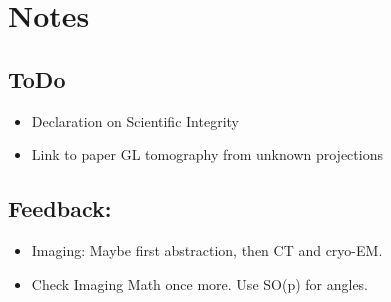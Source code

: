 \chapter{Notes}

\section{ToDo}
\begin{itemize}
    \item Declaration on Scientific Integrity
    \item Link to paper GL tomography from unknown projections
\end{itemize}

\section{Feedback:}
\begin{itemize}
    \item Imaging: Maybe first abstraction, then CT and cryo-EM.
    \item Check Imaging Math once more. Use SO(p) for angles.
\end{itemize}


\clearpage
